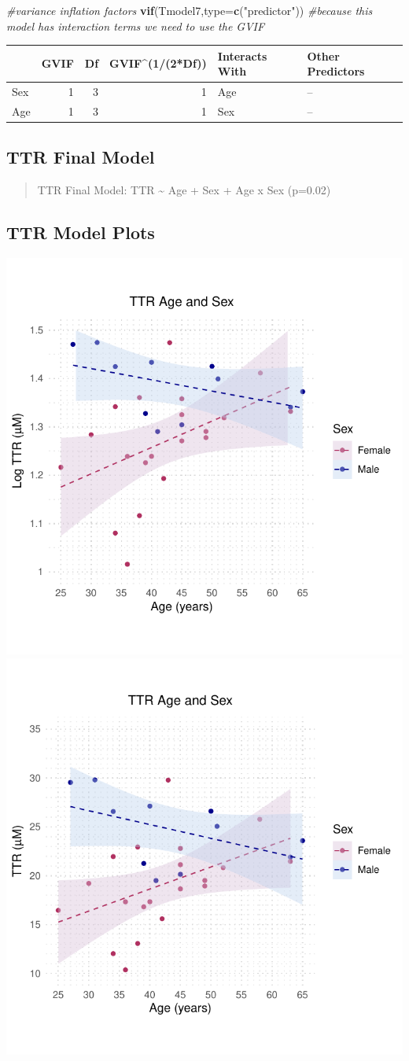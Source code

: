 \documentclass[
]{article}
\newenvironment{Shaded}{\begin{snugshade}}{\end{snugshade}}
\newcommand{\AttributeTok}[1]{\textcolor[rgb]{0.13,0.29,0.53}{#1}}
\newcommand{\CommentTok}[1]{\textcolor[rgb]{0.56,0.35,0.01}{\textit{#1}}}
\newcommand{\FunctionTok}[1]{\textcolor[rgb]{0.13,0.29,0.53}{\textbf{#1}}}
\newcommand{\NormalTok}[1]{#1}
\newcommand{\StringTok}[1]{\textcolor[rgb]{0.31,0.60,0.02}{#1}}
\begin{document}
\begin{Shaded}
\begin{Highlighting}[]
\CommentTok{\#variance inflation factors }
\FunctionTok{vif}\NormalTok{(Tmodel7,}\AttributeTok{type=}\FunctionTok{c}\NormalTok{(}\StringTok{"predictor"}\NormalTok{)) }\CommentTok{\#because this model has interaction terms we need to use the GVIF}
\end{Highlighting}
\end{Shaded}

\begin{longtable}[]{@{}lrrrll@{}}
\toprule\noalign{}
& GVIF & Df & GVIF\^{}(1/(2*Df)) & Interacts With & Other Predictors \\
\midrule\noalign{}
\endhead
\bottomrule\noalign{}
\endlastfoot
Sex & 1 & 3 & 1 & Age & -- \\
Age & 1 & 3 & 1 & Sex & -- \\
\end{longtable}

\subsection{TTR Final Model}\label{ttr-final-model}

\begin{quote}
TTR Final Model: TTR \textasciitilde{} Age + Sex + Age x Sex (p=0.02)
\end{quote}

\subsection{TTR Model Plots}\label{ttr-model-plots}

\includegraphics[width=0.5\linewidth]{StatisticalAnalysis_files/figure-latex/TTR plots-1}
\includegraphics[width=0.5\linewidth]{StatisticalAnalysis_files/figure-latex/TTR plots-2}
\end{document}
